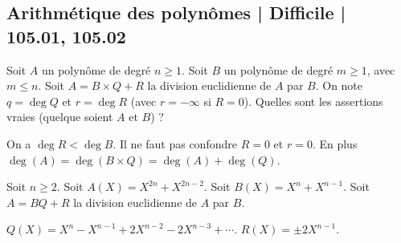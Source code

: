 \subsection{Arithmétique des polynômes | Difficile | 105.01, 105.02}

\begin{question}

Soit $A$ un polynôme de degré $n\ge1$. Soit $B$ un polynôme de degré $m\ge1$, avec $m \le n$.
Soit $A = B \times Q + R$ la division euclidienne de $A$ par $B$. On note
$q = \deg Q$ et $r = \deg R$ (avec $r=-\infty$ si $R=0$).
Quelles sont les assertions vraies (quelque soient $A$ et $B$) ?
\begin{answers}



\end{answers}
\begin{explanations}
On a $\deg R < \deg B$. Il ne faut pas confondre $R=0$ et $r=0$.
En plus $\deg(A) = \deg(B\times Q) = \deg(A) + \deg(Q)$.
\end{explanations}
\end{question}


\begin{question}

Soit $n\ge2$. Soit $A(X) = X^{2n}+X^{2n-2}$. Soit $B(X) = X^{n}+X^{n-1}$. Soit $A = BQ + R$ la division euclidienne de $A$ par $B$. 
\begin{answers}



   
\end{answers}
\begin{explanations}
$Q(X) = X^n-X^{n-1}+2X^{n-2}-2X^{n-3}+\cdots$. $R(X) = \pm 2 X^{n-1}$.
\end{explanations}
\end{question}



